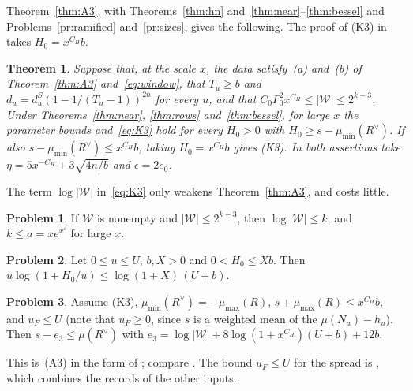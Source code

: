 \documentclass[reqno]{amsart}
\theoremstyle{definition}
\newtheorem{problem}{Problem}[section]
\theoremstyle{plain}
\newtheorem{theorem}{Theorem}[section]
\newcommand{\Wc}{\mathcal{W}}
\newcommand{\mumax}{\mu_{\max}}
\newcommand{\mumin}{\mu_{\min}}
\newcommand{\dS}{d^{S}}
\begin{document}
Theorem~\ref{thm:A3}, with Theorems~\ref{thm:hn} and~\ref{thm:near}--\ref{thm:bessel} and Problems~\ref{pr:ramified} and~\ref{pr:sizes}, gives the following.  The proof of (K3) in \cite[Prop.~18.11(ii)--(iii)]{Adr} takes \(H_0 = x^{C_H}b\).

\begin{theorem}\label{thm:K3}
Suppose that, at the scale \(x\), the data satisfy~(a) and~(b) of Theorem~\ref{thm:A3} and~\eqref{eq:window}, that \(T_u \ge b\) and \(d_u = \dS_u(1 - 1/(T_u - 1))^{2n}\) for every \(u\), and that \(C_0\Gamma_0^2x^{C_H} \le \lvert\Wc\rvert \le 2^{k-3}\).  Under Theorems~\ref{thm:near}, \ref{thm:rows} and~\ref{thm:bessel}, for large \(x\) the parameter bounds and~\eqref{eq:K3} hold for every \(H_0 > 0\) with \(H_0 \ge s - \mumin(R^\vee)\).  If also \(s - \mumin(R^\vee) \le x^{C_H}b\), taking \(H_0 = x^{C_H}b\) gives (K3).  In both assertions take \(\eta = 5x^{-C_H} + 3\sqrt{4n/b}\) and \(\epsilon = 2e_0\).
\end{theorem}

The term \(\log\lvert\Wc\rvert\) in~\eqref{eq:K3} only weakens Theorem~\ref{thm:A3}, and costs little.

\begin{problem}\label{pr:logW}
If \(\Wc\) is nonempty and \(\lvert\Wc\rvert \le 2^{k-3}\), then \(\log\lvert\Wc\rvert \le k\), and \(k \le a = xe^{x^\varepsilon}\) for large \(x\).
\end{problem}

\begin{problem}\label{pr:phi}
Let \(0 \le u \le U\), \(b, X > 0\) and \(0 < H_0 \le Xb\).  Then \(u\log(1 + H_0/u) \le \log(1 + X)\,(U + b)\).
\end{problem}

\begin{problem}\label{pr:A3}
Assume (K3), \(\mumin(R^\vee) = -\mumax(R)\), \(s + \mumax(R) \le x^{C_H}b\), and \(u_F \le U\) (note that \(u_F \ge 0\), since \(s\) is a weighted mean of the \(\mu(N_u) - h_u\)).  Then \(s - e_3 \le \mu(R^\vee)\) with \(e_3 = \log\lvert\Wc\rvert + 8\log(1 + x^{C_H})(U + b) + 12b\).
\end{problem}

This is~(A3) in the form of \cite[Prop.~18.14]{Adr}; compare \cite[Cor.~13.18]{Adr}.  The bound \(u_F \le U\) for the spread is \cite[Lemma~18.13]{Adr}, which combines the records of the other inputs.
\end{document}
